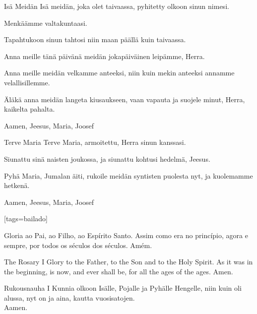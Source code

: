   \vspace{\fill}
  \hardbrk
  \vspace*{11.5ex} %
  \begin{passage}[FI]{Isä Meidän}
    Isä meidän, joka olet taivaassa,
    pyhitetty olkoon sinun nimesi.
    \par
    Menkäämme valtakuntaasi.
    \par
    Tapahtukoon sinun tahtosi niin
    maan päällä kuin taivaassa.
    \par
    Anna meille tänä päivänä meidän
    jokapäiväinen leipämme, Herra.
    \par
    Anna meille meidän velkamme anteeksi,
    niin kuin mekin anteeksi annamme velallisillemme.
    \par
    Äläkä anna meidän langeta kiusaukseen,
    vaan vapauta ja suojele minut,
    Herra, kaikelta pahalta.
    \par
    Aamen, Jeesus, Maria, Joosef
  \end{passage}
  \begin{passage}[FI]{Terve Maria}
    Terve Maria, armoitettu,
    Herra sinun kanssasi.
    \par
    Siunattu sinä naisten joukossa,
    ja siunattu kohtusi hedelmä, Jeesus.
    \par
    Pyhä Maria, Jumalan äiti, rukoile meidän
    syntisten puolesta nyt, ja kuolemamme hetkenä.
    \par
    Aamen, Jeesus, Maria, Joosef
  \end{passage}
  \vspace*{\fill}
\endsong


[tags={bailado}]
  \begin{passage}[PT]{}
    Gloria ao Pai, ao Filho, ao Espírito Santo.
    Assim como era no princípio, agora e sempre,
    por todos os séculos dos séculos. Amém.
  \end{passage}
  \begin{passage}[EN]{The Rosary I}
    Glory to the Father, to the Son and to the Holy Spirit.
    As it was in the beginning, is now, and ever shall be,
    for all the ages of the ages. Amen.
  \end{passage}
  \begin{passage}[FI]{Rukousnauha I}
    Kunnia olkoon Isälle, Pojalle ja Pyhälle Hengelle,
    niin kuin oli alussa, nyt on ja aina,
    kautta vuosisatojen.\\
    Aamen.
  \end{passage}
\endsong


